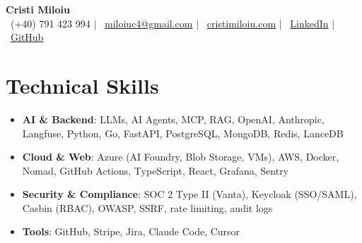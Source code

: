 \documentclass[letterpaper,10pt]{article}
\newcommand{\resumeItem}[1]{\item\small{#1}}
\newcommand{\resumeSubHeadingList}{\begin{itemize}[leftmargin=0.15in, label={}]}
\newcommand{\resumeSubHeadingListEnd}{\end{itemize}}
\begin{document}
\begin{center}
  \textbf{\Huge Cristi Miloiu} \\[5pt]
  \small \faPhone\ (+40) 791 423 994 \enspace $|$ \enspace \faEnvelope\ \href{mailto:miloiuc4@gmail.com}{miloiuc4@gmail.com} \enspace $|$ \enspace
  \faGlobe\ \href{https://cristimiloiu.com}{cristimiloiu.com} \enspace $|$ \enspace
  \faLinkedin\ \href{https://linkedin.com/in/cristi-miloiu-3a174a267}{LinkedIn} \enspace $|$ \enspace
  \faGithub\ \href{https://github.com/cristim67}{GitHub}
\end{center}

\section{Technical Skills}
\resumeSubHeadingList
  \resumeItem{\textbf{AI \& Backend}: LLMs, AI Agents, MCP, RAG, OpenAI, Anthropic, Langfuse, Python, Go, FastAPI, PostgreSQL, MongoDB, Redis, LanceDB}
  \resumeItem{\textbf{Cloud \& Web}: Azure (AI Foundry, Blob Storage, VMs), AWS, Docker, Nomad, GitHub Actions, TypeScript, React, Grafana, Sentry}
  \resumeItem{\textbf{Security \& Compliance}: SOC 2 Type II (Vanta), Keycloak (SSO/SAML), Casbin (RBAC), OWASP, SSRF, rate limiting, audit logs}
  \resumeItem{\textbf{Tools}: GitHub, Stripe, Jira, Claude Code, Cursor}
\resumeSubHeadingListEnd
\end{document}
